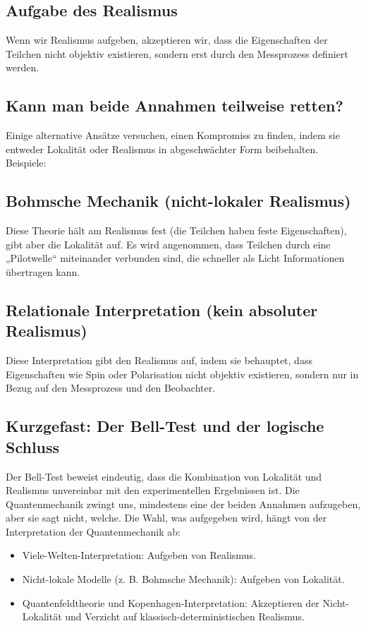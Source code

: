\documentclass[12pt,a4paper]{article}
\begin{document}
	\subsection{Aufgabe des Realismus}
	Wenn wir Realismus aufgeben, akzeptieren wir, dass die Eigenschaften der Teilchen nicht objektiv existieren, sondern erst durch den Messprozess definiert werden.
	
	\subsection{Kann man beide Annahmen teilweise retten?}
	Einige alternative Ansätze versuchen, einen Kompromiss zu finden, indem sie entweder Lokalität oder Realismus in abgeschwächter Form beibehalten. Beispiele:
	
	\subsection{Bohmsche Mechanik (nicht-lokaler Realismus)}
	Diese Theorie hält am Realismus fest (die Teilchen haben feste Eigenschaften), gibt aber die Lokalität auf. Es wird angenommen, dass Teilchen durch eine „Pilotwelle“ miteinander verbunden sind, die schneller als Licht Informationen übertragen kann.
	
	\subsection{Relationale Interpretation (kein absoluter Realismus)}
	Diese Interpretation gibt den Realismus auf, indem sie behauptet, dass Eigenschaften wie Spin oder Polarisation nicht objektiv existieren, sondern nur in Bezug auf den Messprozess und den Beobachter.
	
	\subsection{Kurzgefast: Der Bell-Test und der logische Schluss}
	Der Bell-Test beweist eindeutig, dass die Kombination von Lokalität und Realismus unvereinbar mit den experimentellen Ergebnissen ist. Die Quantenmechanik zwingt uns, mindestens eine der beiden Annahmen aufzugeben, aber sie sagt nicht, welche. Die Wahl, was aufgegeben wird, hängt von der Interpretation der Quantenmechanik ab:
	\begin{itemize}
		\item Viele-Welten-Interpretation: Aufgeben von Realismus.
		\item Nicht-lokale Modelle (z. B. Bohmsche Mechanik): Aufgeben von Lokalität.
		\item Quantenfeldtheorie und Kopenhagen-Interpretation: Akzeptieren der Nicht-Lokalität und Verzicht auf klassisch-deterministischen Realismus.
	\end{itemize}
	
\end{document}
